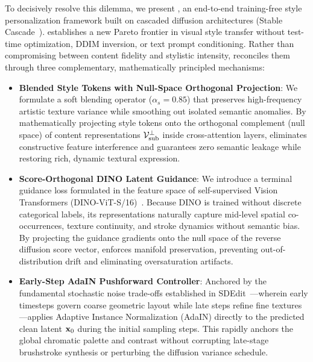 To decisively resolve this dilemma, we present \textbf{\method}, an end-to-end training-free style personalization framework built on cascaded diffusion architectures (Stable Cascade~\cite{wuerstchen}). \method establishes a new Pareto frontier in visual style transfer without test-time optimization, DDIM inversion, or text prompt conditioning. Rather than compromising between content fidelity and stylistic intensity, \method reconciles them through three complementary, mathematically principled mechanisms:
\begin{itemize}
    \item \textbf{Blended Style Tokens with Null-Space Orthogonal Projection}: We formulate a soft blending operator ($\alpha_s = 0.85$) that preserves high-frequency artistic texture variance while smoothing out isolated semantic anomalies. By mathematically projecting style tokens onto the orthogonal complement (null space) of content representations $\mathcal{V}_{\text{sub}}^\perp$ inside cross-attention layers, \method eliminates constructive feature interference and guarantees zero semantic leakage while restoring rich, dynamic textural expression.
    \item \textbf{Score-Orthogonal DINO Latent Guidance}: We introduce a terminal guidance loss formulated in the feature space of self-supervised Vision Transformers (DINO-ViT-S/16)~\cite{dino}. Because DINO is trained without discrete categorical labels, its representations naturally capture mid-level spatial co-occurrences, texture continuity, and stroke dynamics without semantic bias. By projecting the guidance gradients onto the null space of the reverse diffusion score vector, \method enforces manifold preservation, preventing out-of-distribution drift and eliminating oversaturation artifacts.
    \item \textbf{Early-Step AdaIN Pushforward Controller}: Anchored by the fundamental stochastic noise trade-offs established in SDEdit~\cite{sdedit}---wherein early timesteps govern coarse geometric layout while late steps refine fine textures---\method applies Adaptive Instance Normalization (AdaIN) directly to the predicted clean latent $\mathbf{x}_0$ during the initial sampling steps. This rapidly anchors the global chromatic palette and contrast without corrupting late-stage brushstroke synthesis or perturbing the diffusion variance schedule.
\end{itemize}

